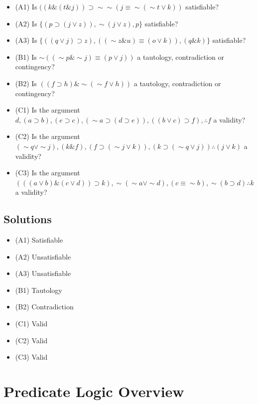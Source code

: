 \documentclass[
]{book}
\providecommand{\tightlist}{%
  \setlength{\itemsep}{0pt}\setlength{\parskip}{0pt}}
\begin{document}
\begin{itemize}
\tightlist
\item
  (A1) Is \(((k \& (t \& j)) \supset \sim \sim (j \equiv \sim (\sim t \lor k))\) satisfiable?
\item
  (A2) Is \(\{(p \supset (j \lor z)), \sim (j \lor z), p\}\) satisfiable?
\item
  (A3) Is \(\{((q \lor j) \supset z), ((\sim z \& u) \equiv (o \lor k)), (q \& k)\}\) satisfiable?
\item
  (B1) Is \(\sim ((\sim p \& \sim j) \equiv (p \lor j))\) a tautology, contradiction or contingency?
\item
  (B2) Is \(((f \supset h) \& \sim(\sim f \lor h))\) a tautology, contradiction or contingency?
\item
  (C1) Is the argument \(d, (a \supset b), (e \supset c), (\sim a \supset (d \supset e)), ((b \lor c) \supset f), \therefore f\) a validity?
\item
  (C2) Is the argument \((\sim q \lor \sim j),(k \& f), (f \supset (\sim j \lor k)), (k \supset (\sim q \lor j)) \therefore (j \lor k)\) a validity?
\item
  (C3) Is the argument \((((a \lor b) \& (c \lor d)) \supset k), \sim(\sim a \lor \sim d), (c \equiv \sim b), \sim (b \supset d) \therefore k\) a validity?
\end{itemize}

\hypertarget{solutions-1}{%
\section{Solutions}\label{solutions-1}}

\begin{itemize}
\tightlist
\item
  (A1) Satisfiable
\item
  (A2) Unsatisfiable
\item
  (A3) Unsatisfiable
\item
  (B1) Tautology
\item
  (B2) Contradiction
\item
  (C1) Valid
\item
  (C2) Valid
\item
  (C3) Valid
\end{itemize}

\hypertarget{predicate-logic-overview}{%
\chapter{Predicate Logic Overview}\label{predicate-logic-overview}}
\end{document}
